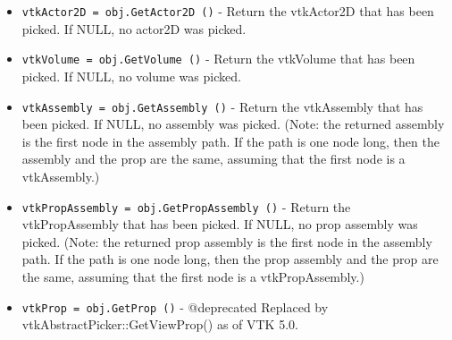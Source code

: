 \begin{itemize}
\item  \verb|vtkActor2D = obj.GetActor2D ()| -  Return the vtkActor2D that has been picked. If NULL, no actor2D was 
 picked.

\item  \verb|vtkVolume = obj.GetVolume ()| -  Return the vtkVolume that has been picked. If NULL, no volume was picked.

\item  \verb|vtkAssembly = obj.GetAssembly ()| -  Return the vtkAssembly that has been picked. If NULL, no assembly 
 was picked. (Note: the returned assembly is the first node in the
 assembly path. If the path is one node long, then the assembly and
 the prop are the same, assuming that the first node is a vtkAssembly.)

\item  \verb|vtkPropAssembly = obj.GetPropAssembly ()| -  Return the vtkPropAssembly that has been picked. If NULL, no prop
 assembly was picked. (Note: the returned prop assembly is the first node
 in the assembly path. If the path is one node long, then the prop
 assembly and the prop are the same, assuming that the first node is a
 vtkPropAssembly.)

\item  \verb|vtkProp = obj.GetProp ()| -  @deprecated Replaced by vtkAbstractPicker::GetViewProp() as of VTK 5.0.

\end{itemize}

